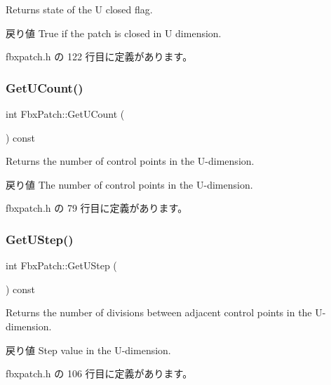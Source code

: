 Returns state of the U closed flag. \begin{DoxyReturn}{戻り値}
{\ttfamily True} if the patch is closed in U dimension. 
\end{DoxyReturn}


 fbxpatch.\+h の 122 行目に定義があります。

\mbox{\label{class_fbx_patch_a4b9ff1fdd6b7ec569f37f4f56a4bb926}} 
\subsubsection{\texorpdfstring{Get\+U\+Count()}{GetUCount()}}
{\footnotesize\ttfamily int Fbx\+Patch\+::\+Get\+U\+Count (\begin{DoxyParamCaption}{ }\end{DoxyParamCaption}) const\hspace{0.3cm}{\ttfamily [inline]}}

Returns the number of control points in the U-\/dimension. \begin{DoxyReturn}{戻り値}
The number of control points in the U-\/dimension. 
\end{DoxyReturn}


 fbxpatch.\+h の 79 行目に定義があります。

\mbox{\label{class_fbx_patch_a875381a084e1b98773fff2bfddcae827}} 
\subsubsection{\texorpdfstring{Get\+U\+Step()}{GetUStep()}}
{\footnotesize\ttfamily int Fbx\+Patch\+::\+Get\+U\+Step (\begin{DoxyParamCaption}{ }\end{DoxyParamCaption}) const\hspace{0.3cm}{\ttfamily [inline]}}

Returns the number of divisions between adjacent control points in the U-\/dimension. \begin{DoxyReturn}{戻り値}
Step value in the U-\/dimension. 
\end{DoxyReturn}


 fbxpatch.\+h の 106 行目に定義があります。

